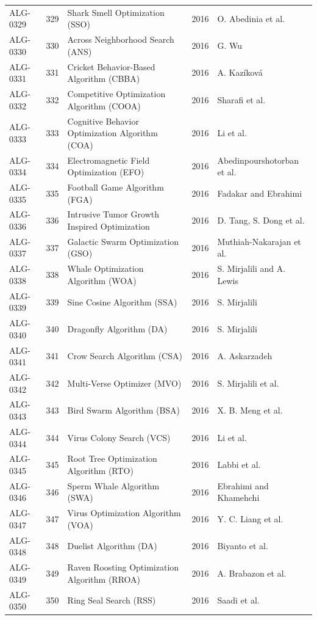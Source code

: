 \documentclass[8pt]{article}
\begin{document}
\begin{landscape}
\begin{longtable}{P{1.7cm}rP{10.0cm}rP{7.2cm}}
ALG-0329 & 329 & Shark Smell Optimization (SSO) & 2016 & O. Abedinia et al. \\
ALG-0330 & 330 & Across Neighborhood Search (ANS) & 2016 & G. Wu \\
ALG-0331 & 331 & Cricket Behavior-Based Algorithm (CBBA) & 2016 & A. Kazíková \\
ALG-0332 & 332 & Competitive Optimization Algorithm (COOA) & 2016 & Sharafi et al. \\
ALG-0333 & 333 & Cognitive Behavior Optimization Algorithm (COA) & 2016 & Li et al. \\
ALG-0334 & 334 & Electromagnetic Field Optimization (EFO) & 2016 & Abedinpourshotorban et al. \\
ALG-0335 & 335 & Football Game Algorithm (FGA) & 2016 & Fadakar and Ebrahimi \\
ALG-0336 & 336 & Intrusive Tumor Growth Inspired Optimization & 2016 & D. Tang, S. Dong et al. \\
ALG-0337 & 337 & Galactic Swarm Optimization (GSO) & 2016 & Muthiah-Nakarajan et al. \\
ALG-0338 & 338 & Whale Optimization Algorithm (WOA) & 2016 & S. Mirjalili and A. Lewis \\
ALG-0339 & 339 & Sine Cosine Algorithm (SSA) & 2016 & S. Mirjalili \\
ALG-0340 & 340 & Dragonfly Algorithm (DA) & 2016 & S. Mirjalili \\
ALG-0341 & 341 & Crow Search Algorithm (CSA) & 2016 & A. Askarzadeh \\
ALG-0342 & 342 & Multi-Verse Optimizer (MVO) & 2016 & S. Mirjalili et al. \\
ALG-0343 & 343 & Bird Swarm Algorithm (BSA) & 2016 & X. B. Meng et al. \\
ALG-0344 & 344 & Virus Colony Search (VCS) & 2016 & Li et al. \\
ALG-0345 & 345 & Root Tree Optimization Algorithm (RTO) & 2016 & Labbi et al. \\
ALG-0346 & 346 & Sperm Whale Algorithm (SWA) & 2016 & Ebrahimi and Khamehchi \\
ALG-0347 & 347 & Virus Optimization Algorithm (VOA) & 2016 & Y. C. Liang et al. \\
ALG-0348 & 348 & Duelist Algorithm (DA) & 2016 & Biyanto et al. \\
ALG-0349 & 349 & Raven Roosting Optimization Algorithm (RROA) & 2016 & A. Brabazon et al. \\
ALG-0350 & 350 & Ring Seal Search (RSS) & 2016 & Saadi et al. \\

\end{longtable}
\end{landscape}
\end{document}
